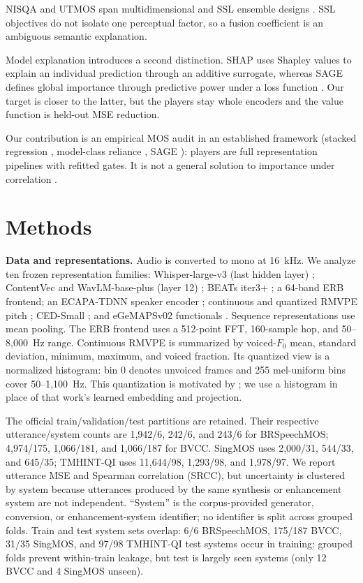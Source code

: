 \documentclass{article}
\begin{document}
NISQA and UTMOS span multidimensional and SSL ensemble designs
\cite{mittag2021nisqa,saeki2022utmos}. SSL objectives do not isolate one
perceptual factor, so a fusion coefficient is an ambiguous semantic explanation.

Model explanation introduces a second distinction. SHAP uses Shapley values to
explain an individual prediction through an additive surrogate, whereas SAGE
defines global importance through predictive power under a loss function
\cite{lundberg2017shap,covert2020sage}. Our target is closer to the latter, but
the players stay whole encoders and the value function is held-out MSE
reduction.

Our contribution is an empirical MOS audit in an established framework
(stacked regression \cite{breiman1996stacked}, model-class reliance
\cite{fisher2019modelclassreliance}, SAGE \cite{covert2020sage}): players are
full representation pipelines with refitted gates. It is not a general solution
to importance under correlation \cite{kumar2020shapley}.

\section{Methods}
\label{sec:method}

\noindent\textbf{Data and representations.} Audio is converted to mono at
16~kHz. We analyze ten frozen representation families: Whisper-large-v3 (last
hidden layer) \cite{radford2022whisper}; ContentVec and WavLM-base-plus (layer
12) \cite{qian2022contentvec,chen2022wavlm}; BEATs iter3+ \cite{chen2023beats};
a 64-band ERB frontend; an ECAPA-TDNN speaker encoder
\cite{desplanques2020ecapa}; continuous and quantized RMVPE pitch
\cite{wei2023rmvpe}; CED-Small \cite{dinkel2024ced}; and
eGeMAPSv02 functionals \cite{eyben2016egemaps}. Sequence representations use
mean pooling. The ERB frontend uses a 512-point FFT, 160-sample hop, and
50--8,000~Hz range. Continuous RMVPE is summarized by voiced-$F_0$ mean,
standard deviation, minimum, maximum, and voiced fraction. Its quantized view
is a normalized histogram: bin 0 denotes unvoiced frames and 255 mel-uniform
bins cover 50--1,100~Hz. This quantization is motivated by
\cite{ferreira2025f0quant}; we use a histogram in place of that work's learned
embedding and projection.

The official train/validation/test partitions are retained. Their respective
utterance/system counts are 1,942/6, 242/6, and 243/6 for BRSpeechMOS;
4,974/175, 1,066/181, and 1,066/187 for BVCC. SingMOS uses 2,000/31, 544/33,
and 645/35; TMHINT-QI uses 11,644/98, 1,293/98, and 1,978/97. We report
utterance MSE and Spearman correlation (SRCC), but uncertainty is clustered by system because
utterances produced by the same synthesis or enhancement system are not
independent. ``System'' is the corpus-provided generator, conversion, or
enhancement-system identifier; no identifier is split across grouped folds.
Train and test system sets overlap: 6/6 BRSpeechMOS, 175/187 BVCC,
31/35 SingMOS, and 97/98 TMHINT-QI test systems occur in training:
grouped folds prevent within-train leakage, but test is largely seen
systems (only 12 BVCC and 4 SingMOS unseen).
\end{document}
